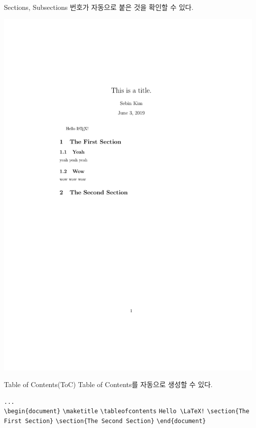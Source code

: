 \documentclass[12pt]{gshs_lecture}
\newenvironment{codeblock}[1]{
	\begin{block}{#1}
		\setstretch{1.0}
		\begin{small}
}{
		\end{small}
	\end{block}
}
\begin{document}
\begin{frame}[t]{Sections, Subsections}
	번호가 자동으로 붙은 것을 확인할 수 있다.
	\vskip 1pc
	\begin{framed}
		\includegraphics[width=\textwidth,trim={3cm 14.5cm 3cm 7cm},clip]{./pdfs/ex4.pdf}
	\end{framed}
\end{frame}

\begin{frame}[t]{Table of Contents(ToC)}
Table of Contents를 자동으로 생성할 수 있다.
\vskip 1pc
\begin{codeblock}{}
	\texttt{...}\\
	\texttt{\textbackslash begin\{document\}}
	\vskip 1pc
	\texttt{\textbackslash maketitle}
	\vskip 1pc
	\texttt{\textbackslash tableofcontents}
	\vskip 1pc
	\texttt{Hello \textbackslash LaTeX!}
	\vskip 1pc
	{\color{red}
		\texttt{\textbackslash section\{The First Section\}}
		\vskip 1pc
		\texttt{\textbackslash section\{The Second Section\}}
	}
	\vskip 1pc
	\texttt{\textbackslash end\{document\}}
\end{codeblock}
\end{frame}
\end{document}
